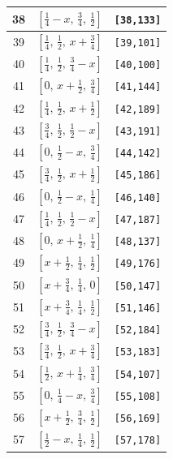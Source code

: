 \documentclass[fleqn,8pt]{jsarticle}
\begin{document}
\begin{longtable}{ccc}
38 & $\left[ \frac{1}{4} - x,\, \frac{3}{4},\, \frac{1}{2} \right]$ & {\tt [38,133]} \\ \hline
39 & $\left[ \frac{1}{4},\, \frac{1}{2},\, x + \frac{3}{4} \right]$ & {\tt [39,101]} \\ \hline
40 & $\left[ \frac{1}{4},\, \frac{1}{2},\, \frac{3}{4} - x \right]$ & {\tt [40,100]} \\ \hline
41 & $\left[ 0,\, x + \frac{1}{2},\, \frac{3}{4} \right]$ & {\tt [41,144]} \\ \hline
42 & $\left[ \frac{1}{4},\, \frac{1}{2},\, x + \frac{1}{2} \right]$ & {\tt [42,189]} \\ \hline
43 & $\left[ \frac{3}{4},\, \frac{1}{2},\, \frac{1}{2} - x \right]$ & {\tt [43,191]} \\ \hline
44 & $\left[ 0,\, \frac{1}{2} - x,\, \frac{3}{4} \right]$ & {\tt [44,142]} \\ \hline
45 & $\left[ \frac{3}{4},\, \frac{1}{2},\, x + \frac{1}{2} \right]$ & {\tt [45,186]} \\ \hline
46 & $\left[ 0,\, \frac{1}{2} - x,\, \frac{1}{4} \right]$ & {\tt [46,140]} \\ \hline
47 & $\left[ \frac{1}{4},\, \frac{1}{2},\, \frac{1}{2} - x \right]$ & {\tt [47,187]} \\ \hline
48 & $\left[ 0,\, x + \frac{1}{2},\, \frac{1}{4} \right]$ & {\tt [48,137]} \\ \hline
49 & $\left[ x + \frac{1}{2},\, \frac{1}{4},\, \frac{1}{2} \right]$ & {\tt [49,176]} \\ \hline
50 & $\left[ x + \frac{3}{4},\, \frac{1}{4},\, 0 \right]$ & {\tt [50,147]} \\ \hline
51 & $\left[ x + \frac{3}{4},\, \frac{1}{4},\, \frac{1}{2} \right]$ & {\tt [51,146]} \\ \hline
52 & $\left[ \frac{3}{4},\, \frac{1}{2},\, \frac{3}{4} - x \right]$ & {\tt [52,184]} \\ \hline
53 & $\left[ \frac{3}{4},\, \frac{1}{2},\, x + \frac{3}{4} \right]$ & {\tt [53,183]} \\ \hline
54 & $\left[ \frac{1}{2},\, x + \frac{1}{4},\, \frac{3}{4} \right]$ & {\tt [54,107]} \\ \hline
55 & $\left[ 0,\, \frac{1}{4} - x,\, \frac{3}{4} \right]$ & {\tt [55,108]} \\ \hline
56 & $\left[ x + \frac{1}{2},\, \frac{3}{4},\, \frac{1}{2} \right]$ & {\tt [56,169]} \\ \hline
57 & $\left[ \frac{1}{2} - x,\, \frac{1}{4},\, \frac{1}{2} \right]$ & {\tt [57,178]} \\ \hline

\end{longtable}
\end{document}
